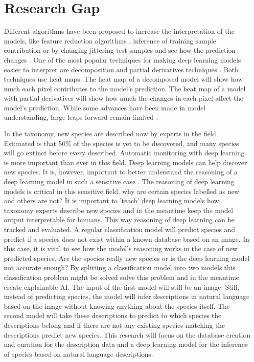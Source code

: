 \documentclass{article}
\begin{document}
\section{Research Gap}
Different algorithms have been proposed to increase the interpretation of the models, like feature reduction algorithms \cite{ribeiro_why_2016}, inference of training sample contribution \cite{koh_understanding_2020} or by changing jittering test samples and see how the prediction changes \cite{li_understanding_2017}.
One of the most popular techniques for making deep learning models easier to interpret are decomposition and partial derivatives techniques \cite{samek_explainable_2017}.
Both techniques use heat maps.
The heat map of a decomposed model will show how much each pixel contributes to the model's prediction.
The heat map of a model with partial derivatives will show how much the changes in each pixel affect the model's prediction.
While some advances have been made in model understanding, large leaps forward remain limited \cite{lipton_mythos_2017, li_interpretable_2021}.

In the taxonomy, new species are described now by experts in the field.
Estimated is that 50\% of the species is yet to be discovered, and many species will go extinct before every described.
Automatic monitoring with deep learning is more important than ever in this field.
Deep learning models can help discover new species.
It is, however, important to better understand the reasoning of a deep learning model in such a sensitive case \cite{carvalho_machine_2019}.
The reasoning of deep learning models is critical in this sensitive field, why are certain species labelled as new and others are not?
It is important to 'teach' deep learning models how taxonomy experts describe new species and in the meantime keep the model output interpretable for humans.
This way reasoning of deep learning can be tracked and evaluated.
A regular classification model will predict species and predict if a species does not exist within a known database based on an image.
In this case, it is vital to see how the model's reasoning works in the case of new predicted species.
Are the species really new species or is the deep learning model not accurate enough?
By splitting a classification model into two models this classification problem might be solved solve this problem and in the meantime create explainable AI.
The input of the first model will still be an image. Still, instead of predicting species, the model will infer descriptions in natural language based on the image without knowing anything about the species itself.
The second model will take these descriptions to predict to which species the descriptions belong and if there are not any existing species matching the descriptions predict new species.
This research will focus on the database creation and curation for the description data and a deep learning model for the inference of species based on natural language descriptions.
\end{document}
